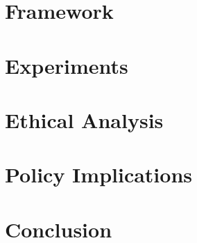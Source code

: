 \documentclass[sigconf]{acmart}
\begin{document}
\section{Framework}

\section{Experiments}

\section{Ethical Analysis}

\section{Policy Implications}

\section{Conclusion}



\end{document}
